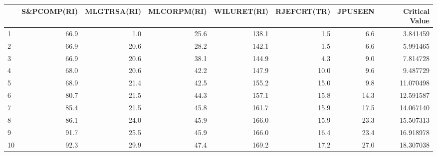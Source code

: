 \begin{tabular}{lrrrrrrr}
\toprule
{} &  S\&PCOMP(RI) &  MLGTRSA(RI) &  MLCORPM(RI) &  WILURET(RI) &  RJEFCRT(TR) &  JPUSEEN &  Critical Value \\
\midrule
1  &         66.9 &          1.0 &         25.6 &        138.1 &          1.5 &      6.6 &        3.841459 \\
2  &         66.9 &         20.6 &         28.2 &        142.1 &          1.5 &      6.6 &        5.991465 \\
3  &         66.9 &         20.6 &         38.1 &        144.9 &          4.3 &      9.0 &        7.814728 \\
4  &         68.0 &         20.6 &         42.2 &        147.9 &         10.0 &      9.6 &        9.487729 \\
5  &         68.9 &         21.4 &         42.5 &        155.2 &         15.0 &      9.8 &       11.070498 \\
6  &         80.7 &         21.5 &         44.3 &        157.1 &         15.8 &     14.3 &       12.591587 \\
7  &         85.4 &         21.5 &         45.8 &        161.7 &         15.9 &     17.5 &       14.067140 \\
8  &         86.1 &         24.0 &         45.9 &        166.0 &         15.9 &     23.3 &       15.507313 \\
9  &         91.7 &         25.5 &         45.9 &        166.0 &         16.4 &     23.4 &       16.918978 \\
10 &         92.3 &         29.9 &         47.4 &        169.2 &         17.2 &     27.0 &       18.307038 \\
\bottomrule
\end{tabular}
